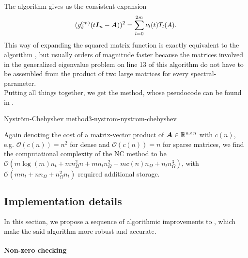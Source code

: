 The algorithm gives us the consistent expansion
\begin{equation}
    (g_{\sigma}^{(m)}(t\boldsymbol{I}_n - \boldsymbol{A}))^2 = \sum_{l=0}^{2m} \nu_l(t) T_l(A).
    \label{equ:3-nystrom-consistent-chebyshev-expansion}
\end{equation}
This way of expanding the squared matrix function
is exactly equivalent to the 
algorithm \cite[algorithm~5]{lin2017randomized}, but
usually orders of magnitude faster because the matrices involved in the
generalized eigenvalue problem
on line 13 of this algorithm do not have to be assembled from the
product of two large matrices for every \gls{spectral-parameter}.\\


Putting all things together, we get the  method, whose pseudocode
can be found in .
\begin{algo}{Nystr\"om-Chebyshev method}{3-nystrom-nystrom-chebyshev}
    
\end{algo}

Again denoting the cost of a matrix-vector product of $\boldsymbol{A} \in \mathbb{R}^{n \times n}$
with $c(n)$, e.g. $\mathcal{O}(c(n)) = n^2$ for dense and $\mathcal{O}(c(n)) = n$
for sparse matrices, we find the computational complexity of the \gls{NC}
method to be $\mathcal{O}(m \log(m) n_t + m n_{\Omega}^2 n + m n_t n_{\Omega}^2 +  m c(n) n_{\Omega} + n_t n_{\Omega}^3)$, with
$\mathcal{O}(m n_t + n n_{\Omega} + n_{\Omega}^2 n_t)$ required additional storage.


\subsection{Implementation details}
\label{subsec:3-nystrom-implementation-details}

In this section, we propose a sequence of algorithmic improvements to
, which make the said algorithm more
robust and accurate.

\paragraph{Non-zero checking}


